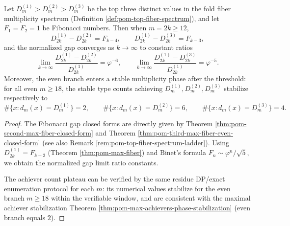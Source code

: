\begin{conclusion}\label{con:xi-terminal-top3-fiber-spectrum-stable-multiplicity-phase}
Let \(D_m^{(1)}>\!D_m^{(2)}>\!D_m^{(3)}\) be the top three distinct values in the fold fiber multiplicity spectrum (Definition \ref{def:pom-top-fiber-spectrum}), and let \(F_1=F_2=1\) be Fibonacci numbers.
Then when \(m=2k\ge 12\),
\[
D_{2k}^{(1)}-D_{2k}^{(2)}=F_{k-4},
\qquad
D_{2k}^{(1)}-D_{2k}^{(3)}=F_{k-3},
\]
and the normalized gap converges as \(k\to\infty\) to constant ratios
\[
\lim_{k\to\infty}\frac{D_{2k}^{(1)}-D_{2k}^{(2)}}{D_{2k}^{(1)}}=\varphi^{-6},
\qquad
\lim_{k\to\infty}\frac{D_{2k}^{(1)}-D_{2k}^{(3)}}{D_{2k}^{(1)}}=\varphi^{-5}.
\]
Moreover, the even branch enters a stable multiplicity phase after the threshold: for all even \(m\ge 18\), the stable type counts achieving \(D_m^{(1)},D_m^{(2)},D_m^{(3)}\) stabilize respectively to
\[
\#\{x:d_m(x)=D_m^{(1)}\}=2,\qquad
\#\{x:d_m(x)=D_m^{(2)}\}=6,\qquad
\#\{x:d_m(x)=D_m^{(3)}\}=4.
\]
\end{conclusion}
\begin{proof}
The Fibonacci gap closed forms are directly given by Theorem \ref{thm:pom-second-max-fiber-closed-form} and Theorem \ref{thm:pom-third-max-fiber-even-closed-form} (see also Remark \ref{rem:pom-top-fiber-spectrum-ladder}).
Using \(D_{2k}^{(1)}=F_{k+2}\) (Theorem \ref{thm:pom-max-fiber}) and Binet's formula \(F_n\sim \varphi^n/\sqrt5\), we obtain the normalized gap limit ratio constants.
\par
The achiever count plateau can be verified by the same residue DP/exact enumeration protocol for each \(m\): its numerical values stabilize for the even branch \(m\ge 18\) within the verifiable window, and are consistent with the maximal achiever stabilization Theorem \ref{thm:pom-max-achievers-phase-stabilization} (even branch equals \(2\)).
\end{proof}

